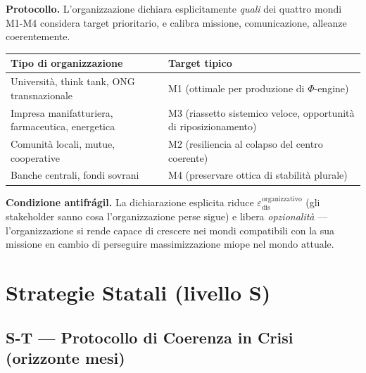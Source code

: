 \Hypoth{} \textbf{Protocollo.} L'organizzazione dichiara esplicitamente
\emph{quali} dei quattro mondi M1-M4 considera target prioritario, e
calibra missione, comunicazione, alleanze coerentemente.

{\def\LTcaptype{none} %
{\small\begin{longtable}[]{@{}
  >{\raggedright\arraybackslash}p{}
  >{\raggedright\arraybackslash}p{}@{}}
\toprule\noalign{}
\begin{minipage}[b]{\linewidth}\raggedright
Tipo di organizzazione
\end{minipage} & \begin{minipage}[b]{\linewidth}\raggedright
Target tipico
\end{minipage} \\
\midrule\noalign{}
\endhead
\bottomrule\noalign{}
\endlastfoot
Università, think tank, ONG transnazionale & M1 (ottimale per produzione
di \(\Phi\)-engine) \\
Impresa manifatturiera, farmaceutica, energetica & M3 (riassetto
sistemico veloce, opportunità di riposizionamento) \\
Comunità locali, mutue, cooperative & M2 (resiliencia al colapso del
centro coerente) \\
Banche centrali, fondi sovrani & M4 (preservare ottica di stabilità
plurale) \\
\end{longtable}}
}

\Proved{} \textbf{Condizione antifrágil.} La dichiarazione esplicita
riduce \(\varepsilon_{\text{dis}}^{\text{organizzativo}}\) (gli
stakeholder sanno cosa l'organizzazione perse sigue) e libera
\emph{opzionalità} --- l'organizzazione si rende capace di crescere nei
mondi compatibili con la sua missione en cambio di perseguire
massimizzazione miope nel mondo attuale.



\section{Strategie Statali (livello
S)}\label{strategie-statali-livello-s}

\subsection{S-T --- Protocollo di Coerenza in Crisi (orizzonte
mesi)}\label{s-t-protocollo-di-coerenza-in-crisi-orizzonte-mesi}

